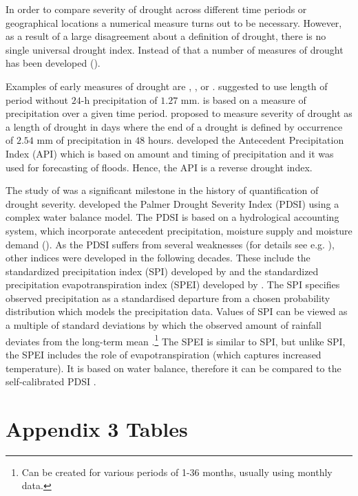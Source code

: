 \documentclass[a4paper,12pt]{article}
\begin{document}
In order to compare severity of drought across different time periods or geographical locations a numerical measure turns out to be necessary. However, as a result of a large disagreement about a definition of drought, there is no single universal drought index. Instead of that a number of measures of drought has been developed (\citealp{ wilhite1985, wilhite2000, Heim2002}).

 
 
Examples of early measures of drought are \cite{wilhite1985}, \cite{munger1916}, \cite{blumenstock1942} or \cite{mcquigg1954}. \cite{munger1916} suggested to use length of period without $24$-h precipitation of $1.27$ mm. \cite{wilhite1985} is based on a measure of precipitation over a given time period. \cite{blumenstock1942} proposed to measure severity of drought as a length of drought in days where the end of a drought is defined by occurrence of $2.54$ mm of precipitation in $48$ hours. \cite{mcquigg1954} developed the Antecedent Precipitation Index (API) which is based on amount and timing of precipitation and it was used for forecasting of floods. Hence, the API is a reverse drought index.

The study of \cite{palmer1965} was a significant milestone in the history of quantification of drought severity. \cite{palmer1965} developed the Palmer Drought Severity Index (PDSI) using a complex water balance model. The PDSI is based on a hydrological accounting system, which incorporate antecedent precipitation, moisture supply and moisture demand (\citealp{Heim2002,palmer1965}). As the PDSI suffers from several weaknesses (for details see e.g. \citealt{Heim2002}), other indices were developed in the following decades. These include the standardized precipitation index (SPI) developed by \cite{SPI} and the standardized precipitation evapotranspiration index (SPEI) developed by \cite{SPEI}. The SPI specifies observed precipitation as a standardised departure from a chosen probability distribution which models the precipitation data. Values of SPI can be viewed as a multiple of standard deviations by which the observed amount of rainfall deviates from the long-term mean \citep{SPIonline}.\footnote{Can be created for various periods of 1-36 months, usually using monthly data.} The SPEI is similar to SPI, but unlike SPI, the SPEI includes the role of evapotranspiration (which captures increased temperature). It is based on water balance, therefore it can be compared to the self-calibrated PDSI \citep{SPEI}. 


\section{Appendix 3 Tables}
\end{document}
